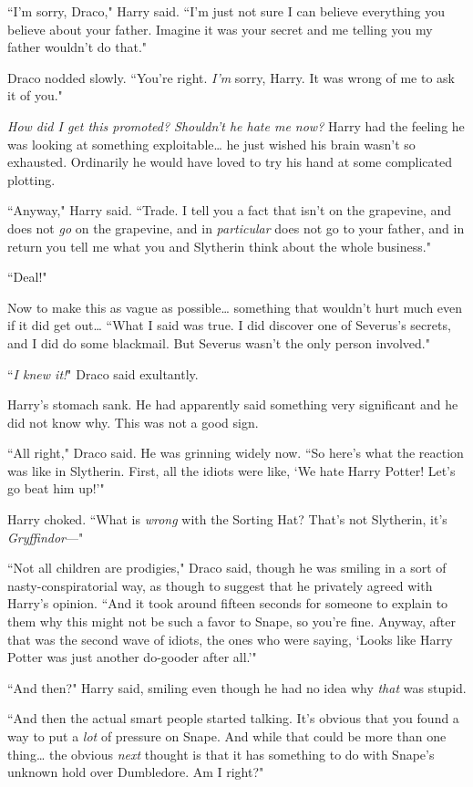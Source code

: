 ``I'm sorry, Draco," Harry said. ``I'm just not sure I can believe everything you believe about your father. Imagine it was your secret and me telling you my father wouldn't do that."

Draco nodded slowly. ``You're right. \emph{I'm} sorry, Harry. It was wrong of me to ask it of you."

\emph{How did I get \emph{this} promoted? Shouldn't he hate me now?} Harry had the feeling he was looking at something exploitable{\ldots} he just wished his brain wasn't so exhausted. Ordinarily he would have loved to try his hand at some complicated plotting.

``Anyway," Harry said. ``Trade. I tell you a fact that isn't on the grapevine, and does not \emph{go} on the grapevine, and in \emph{particular} does not go to your father, and in return you tell me what you and Slytherin think about the whole business."

``Deal!"

Now to make this as vague as possible{\ldots} something that wouldn't hurt much even if it did get out{\ldots} ``What I said was true. I did discover one of Severus's secrets, and I did do some blackmail. But Severus wasn't the only person involved."

``\emph{I knew it!}" Draco said exultantly.

Harry's stomach sank. He had apparently said something very significant and he did not know why. This was not a good sign.

``All right," Draco said. He was grinning widely now. ``So here's what the reaction was like in Slytherin. First, all the idiots were like, `We hate Harry Potter! Let's go beat him up!'"

Harry choked. ``What is \emph{wrong} with the Sorting Hat? That's not Slytherin, it's \emph{Gryffindor}—"

``Not all children are prodigies," Draco said, though he was smiling in a sort of nasty-conspiratorial way, as though to suggest that he privately agreed with Harry's opinion. ``And it took around fifteen seconds for someone to explain to them why this might not be such a favor to Snape, so you're fine. Anyway, after that was the second wave of idiots, the ones who were saying, `Looks like Harry Potter was just another do-gooder after all.'"

``And then?" Harry said, smiling even though he had no idea why \emph{that} was stupid.

``And then the actual smart people started talking. It's obvious that you found a way to put a \emph{lot} of pressure on Snape. And while that could be more than one thing{\ldots} the obvious \emph{next} thought is that it has something to do with Snape's unknown hold over Dumbledore. Am I right?"

